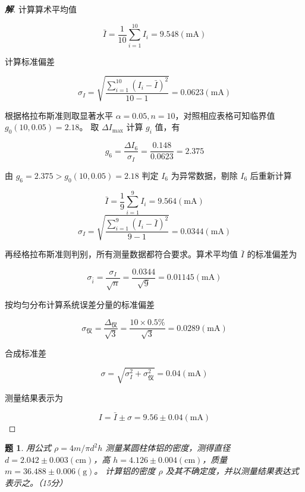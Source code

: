 \documentclass{article}
\newtheorem{problem}{题}
\newenvironment{solution}
{\begin{proof}[\textbf{解}]\renewcommand{\qedsymbol}{}}
{\end{proof}}
\begin{document}
\begin{solution}

计算算术平均值

\[
\bar{I} = \frac{1}{10}\sum_{i=1}^{10} I_i = 9.548(\mathrm{mA})
\]

计算标准偏差

\[
\sigma_I = \sqrt{\frac{\sum_{i=1}^{10} \left(I_i - \bar{I}\right)^2}{10 - 1}} = 0.0623(\mathrm{mA})
\]

根据格拉布斯准则取显著水平 $\alpha = 0.05, n = 10$，对照相应表格可知临界值 $ g_0({10,0.05}) = 2.18 $。
取 $\Delta I_{\max}$ 计算 $g_i$ 值，有

\[
g_6 = \frac{\Delta I_6}{\sigma_I}=\frac{0.148}{0.0623} = 2.375
\]


由 $g_6=2.375 > g_0({10,0.05}) = 2.18$ 判定 $I_6$ 为异常数据，剔除 $I_6$ 后重新计算

\[ \bar{I} = \frac{1}{9}\sum_{i=1}^{9} I_i = 9.564(\mathrm{mA}) \]
\[ \sigma_I = \sqrt{\frac{\sum_{i=1}^{9} \left(I_i - \bar{I}\right)^2}{9 - 1}} = 0.0344(\mathrm{mA}) \]

再经格拉布斯准则判别，所有测量数据都符合要求。算术平均值 $\bar{I}$ 的标准偏差为

\[
{\sigma}_{\bar{{i}}}=\frac{{\sigma}_{I}}{\sqrt{n}}=\frac{{0}.{0344}}{\sqrt{9}}={0}.{01145}(\mathrm{mA})
\]

按均匀分布计算系统误差分量的标准偏差

\[
\sigma_{\text{仪}} = \frac{\Delta_{\text{仪}}}{\sqrt{3}} = \frac{10 \times 0.5\%}{\sqrt{3}} = 0.0289(\mathrm{mA})
\]

合成标准差

\[
\sigma = \sqrt{\sigma_{{I}}^2 + \sigma_{\text{仪}}^2} = 0.04(\mathrm{mA})
\]

测量结果表示为

\[
I = \bar{I} \pm \sigma = 9.56 \pm 0.04(\mathrm{mA})
\]

\end{solution}

\begin{problem}
    用公式 $\rho=4m/ \pi d^2h$ 测量某圆柱体铝的密度，测得直径 $d = 2.042 \pm 0.003 \mathrm{(cm)}$，高 $h = 4.126 \pm 0.004 \mathrm{(cm)}$，质量 $m = 36.488 \pm 0.006 \mathrm{(g)}$。
    计算铝的密度 $\rho$ 及其不确定度，并以测量结果表达式表示之。（15分）
\end{problem}
\end{document}
